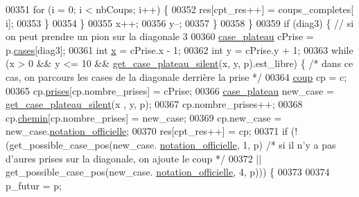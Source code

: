 \begin{DoxyCode}
00351                                         \textcolor{keywordflow}{for} (i = 0; i < nbCoups; i++) \{
00352                                                 res[cpt\_res++] = coups\_completes[
      i];
00353                                         \}
00354                                 \}
00355                                 x++;
00356                                 y--;
00357                         \}
00358                 \}
00359                 \textcolor{keywordflow}{if} (diag3) \{ \textcolor{comment}{// si on peut prendre un pion sur la diagonale 3}
00360                         \hyperlink{structcase__plateau}{case_plateau} cPrise = p.\hyperlink{structplateau_a6afaa60f594542e0d742b0c6d3223392}{cases}[diag3];
00361                         \textcolor{keywordtype}{int} \hyperlink{plateau_8h_a9e00f85b4b6ec2d8bdfbe94ff40f0eeeacab1e15e82c5976bfb476ddfe145263c}{x} = cPrise.x - 1;
00362                         \textcolor{keywordtype}{int} y = cPrise.y + 1;
00363                         \textcolor{keywordflow}{while} (x > 0 && y <= 10 && \hyperlink{plateau_8h_a60a8f706865d0ae9087f8d65d4667655}{get_case_plateau_silent}(x, y, 
      p).est\_libre) \{ \textcolor{comment}{/* dans ce cas, on parcours les cases de la diagonale derrière la
       prise */}
00364                                 \hyperlink{structcoup}{coup} cp = c;
00365                                 cp.\hyperlink{structcoup_ae19b3a66d3f4e66b8f69a38e4005f44a}{prises}[cp.nombre\_prises] = cPrise;
00366                                 \hyperlink{structcase__plateau}{case_plateau} new\_case = \hyperlink{plateau_8h_a60a8f706865d0ae9087f8d65d4667655}{get_case_plateau_silent}(x
      , y, p);
00367                                 cp.nombre\_prises++;
00368                                 cp.\hyperlink{structcoup_aa66b88eb8140c2f459ac92fad0796510}{chemin}[cp.nombre\_prises] = new\_case;
00369                                 cp.new\_case = new\_case.\hyperlink{structcase__plateau_ad510581b324604a9cf685cbb769a421a}{notation_officielle};
00370                                 res[cpt\_res++] = cp;
00371                                 \textcolor{keywordflow}{if} (!(get\_possible\_case\_pos(new\_case.
      \hyperlink{structcase__plateau_ad510581b324604a9cf685cbb769a421a}{notation_officielle}, 1, p) \textcolor{comment}{/* si il n'y a pas d'aures prises sur la diagonale, on
       ajoute le coup */}
00372                                 || get\_possible\_case\_pos(new\_case.
      \hyperlink{structcase__plateau_ad510581b324604a9cf685cbb769a421a}{notation_officielle}, 4, p))) \{
00373 
00374                                         p\_futur = p;

\end{DoxyCode}
